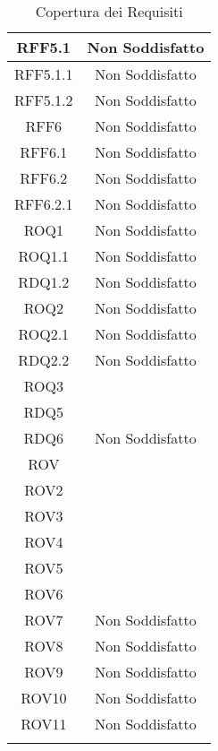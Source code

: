 \begin{center}
\begin{longtable}[c]{|c|c|}
\hline
RFF5.1 & \cellcolor{rosso}Non Soddisfatto\\
\hline
RFF5.1.1 & \cellcolor{rosso}Non Soddisfatto\\
\hline
RFF5.1.2 & \cellcolor{rosso}Non Soddisfatto\\
\hline
RFF6 & \cellcolor{rosso}Non Soddisfatto\\
\hline
RFF6.1 & \cellcolor{rosso}Non Soddisfatto\\
\hline
RFF6.2 & \cellcolor{rosso}Non Soddisfatto\\
\hline
RFF6.2.1 & \cellcolor{rosso}Non Soddisfatto\\
\hline
ROQ1 & \cellcolor{rosso}Non Soddisfatto\\
\hline
ROQ1.1 & \cellcolor{rosso}Non Soddisfatto\\
\hline
RDQ1.2 & \cellcolor{rosso}Non Soddisfatto\\
\hline
ROQ2 & \cellcolor{rosso}Non Soddisfatto\\
\hline
ROQ2.1 & \cellcolor{rosso}Non Soddisfatto\\
\hline
RDQ2.2 & \cellcolor{rosso}Non Soddisfatto\\
\hline
ROQ3 & \cellcolor{verde}\textcolor{white}{Soddisfatto}\\
\hline
RDQ5 & \cellcolor{verde}\textcolor{white}{Soddisfatto}\\
\hline
RDQ6 & \cellcolor{rosso}Non Soddisfatto\\
\hline
ROV & \cellcolor{verde}\textcolor{white}{Soddisfatto}\\
\hline
ROV2 & \cellcolor{verde}\textcolor{white}{Soddisfatto}\\
\hline
ROV3 & \cellcolor{verde}\textcolor{white}{Soddisfatto}\\
\hline
ROV4 & \cellcolor{verde}\textcolor{white}{Soddisfatto}\\
\hline
ROV5 & \cellcolor{verde}\textcolor{white}{Soddisfatto}\\
\hline
ROV6 & \cellcolor{verde}\textcolor{white}{Soddisfatto}\\
\hline
ROV7 & \cellcolor{rosso}Non Soddisfatto\\
\hline
ROV8 & \cellcolor{rosso}Non Soddisfatto\\
\hline
ROV9 & \cellcolor{rosso}Non Soddisfatto\\
\hline
ROV10 & \cellcolor{rosso}Non Soddisfatto\\
\hline
ROV11 & \cellcolor{rosso}Non Soddisfatto\\
\hline
\caption{Copertura dei Requisiti}
\end{longtable}
\end{center}
